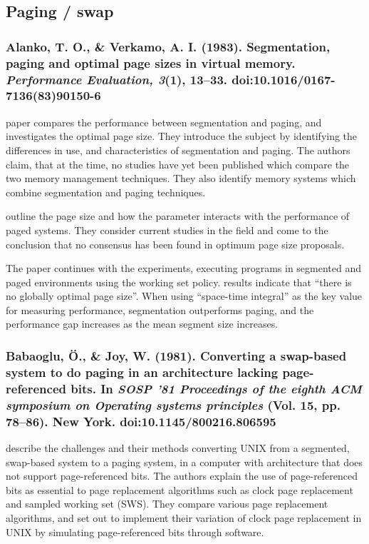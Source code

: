 \newpage

\subsection{Paging / swap}

\subsubsection*{Alanko, T. O., \& Verkamo, A. I. (1983). Segmentation, paging and optimal page sizes in virtual memory. \emph{Performance Evaluation, 3}(1), 13–33. doi:10.1016/0167-7136(83)90150-6}

 paper compares the performance between segmentation and paging, and investigates the optimal page size. They introduce the subject by identifying the differences in use, and characteristics of segmentation and paging. The authors claim, that at the time, no studies have yet been published which compare the two memory management techniques. They also identify memory systems which combine segmentation and paging techniques.

\citet{Alanko1983} outline the page size and how the parameter interacts with the performance of paged systems. They consider current studies in the field and come to the conclusion that no consensus has been found in optimum page size proposals.

The paper continues with the experiments, executing programs in segmented and paged environments using the working set policy.  results indicate that ``there is no globally optimal page size''. When using ``space-time integral'' as the key value for measuring performance, segmentation outperforms paging, and the performance gap increases as the mean segment size increases. 

\subsubsection*{Babaoglu, Ö., \& Joy, W. (1981). Converting a swap-based system to do paging in an architecture lacking page-referenced bits. In \emph{SOSP ’81 Proceedings of the eighth ACM symposium on Operating systems principles} (Vol. 15, pp. 78–86). New York. doi:10.1145/800216.806595}

\citet{Babaoglu1981} describe the challenges and their methods converting UNIX from a segmented, swap-based system to a paging system, in a computer with architecture that does not support page-referenced bits. The authors explain the use of page-referenced bits as essential to page replacement algorithms such as clock page replacement and sampled working set (SWS). They compare various page replacement algorithms, and set out to implement their variation of clock page replacement in UNIX by simulating page-referenced bits through software.

